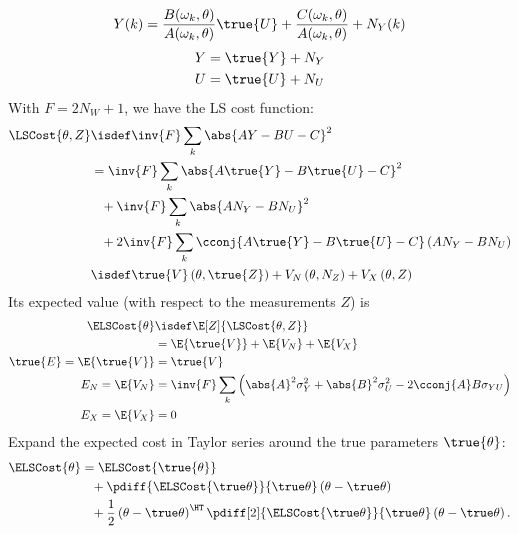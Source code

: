 \begin{equation}
  Y(k) = \frac{B(\omega_k,\theta)}{A(\omega_k,\theta)} \true{U} +  \frac{C(\omega_k,\theta)}{A(\omega_k,\theta)}+ N_Y(k)
\end{equation}
\begin{align}
  Y &= \true{Y} + N_Y \\
  U &= \true{U} + N_U \\
\end{align}
With $F= 2N_W + 1$, we have the LS cost function:
\begin{align}
  \LSCost{\theta, Z} &\isdef \inv{F}\sum_k \abs{AY - BU - C}^{2} \\
                     &= \inv{F}\sum_k \abs{A\true{Y} - B\true{U} -C}^2 \\
          &\phantom{=}+ \inv{F}\sum_k \abs{AN_Y - BN_U}^2  \\
          &\phantom{=}+2\inv{F}\sum_k \cconj{A\true{Y} - B\true{U} - C} \left( AN_Y - BN_U \right)\\
                     &\isdef \true{V}\left( \theta, \true{Z} \right)  + V_N\left( \theta, N_{Z} \right) + V_X\left( \theta, {Z} \right)
\end{align}
Its expected value (with respect to the measurements $Z$) is
\begin{align}
  \ELSCost{\theta} &\isdef \E[Z]{\LSCost{\theta,Z}} \\
                   &= \E{\true{V}} + \E{V_N} + \E{V_X} \\
      \true{E} = \E{\true{V}} &= \true{V} \\
      E_N = \E{V_N}      &= \inv{F} \sum_k \left( \abs{A}^2 \sigma_Y^2
                                          +  \abs{B}^2 \sigma_U^2
                                   - 2\cconj{A}B \sigma_{YU}
                                    \right)\\
      E_X = \E{V_X}      &= 0
\end{align}
Expand the expected cost in Taylor series around the true parameters $\true{\theta}$:
\begin{align}
  \ELSCost{\theta} &= 
                     \ELSCost{\true{\theta}} \\
          &\phantom{=}+ \pdiff{\ELSCost{\true\theta}}{\true\theta} \left( \theta - \true\theta \right) \\
          &\phantom{=}+ \frac{1}{2} \left( \theta - \true\theta \right)^{\HT}
                      \pdiff[2]{\ELSCost{\true\theta}}{\true\theta}
                     \left( \theta - \true\theta \right)
                     \text{.}
\end{align}
